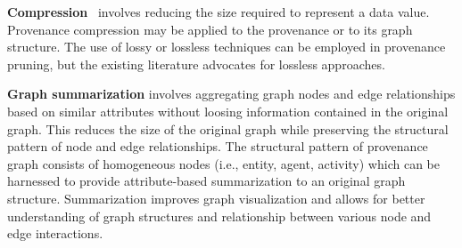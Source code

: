 \textbf{Compression}~\cite{xie11-tapp,hussain_secure_2014, 7038199} involves reducing the size required to represent a data value. Provenance compression may be applied to the provenance or to its graph structure. The use of lossy or lossless techniques can be employed in provenance pruning, but the existing literature advocates for lossless approaches.

\textbf{Graph summarization} involves aggregating graph nodes and edge relationships based on similar attributes without loosing information contained in the original graph. This reduces the size of the original graph while preserving the structural pattern of node and edge relationships. The structural pattern of provenance graph consists of homogeneous nodes (i.e., entity, agent, activity) which can be harnessed to provide attribute-based summarization to an original graph structure. Summarization improves graph visualization and allows for better understanding of graph structures and relationship between various node and edge interactions.


